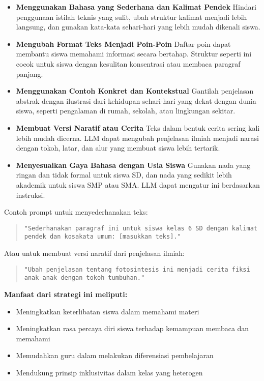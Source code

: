 \begin{itemize}
	\item \textbf{Menggunakan Bahasa yang Sederhana dan Kalimat Pendek}  
	Hindari penggunaan istilah teknis yang sulit, ubah struktur kalimat menjadi lebih langsung, dan gunakan kata-kata sehari-hari yang lebih mudah dikenali siswa.
	
	\item \textbf{Mengubah Format Teks Menjadi Poin-Poin}  
	Daftar poin dapat membantu siswa memahami informasi secara bertahap. Struktur seperti ini cocok untuk siswa dengan kesulitan konsentrasi atau membaca paragraf panjang.
	
	\item \textbf{Menggunakan Contoh Konkret dan Kontekstual}  
	Gantilah penjelasan abstrak dengan ilustrasi dari kehidupan sehari-hari yang dekat dengan dunia siswa, seperti pengalaman di rumah, sekolah, atau lingkungan sekitar.
	
	\item \textbf{Membuat Versi Naratif atau Cerita}  
	Teks dalam bentuk cerita sering kali lebih mudah dicerna. LLM dapat mengubah penjelasan ilmiah menjadi narasi dengan tokoh, latar, dan alur yang membuat siswa lebih tertarik.
	
	\item \textbf{Menyesuaikan Gaya Bahasa dengan Usia Siswa}  
	Gunakan nada yang ringan dan tidak formal untuk siswa SD, dan nada yang sedikit lebih akademik untuk siswa SMP atau SMA. LLM dapat mengatur ini berdasarkan instruksi.
	
\end{itemize}

Contoh prompt untuk menyederhanakan teks:

\begin{quote}
	\centering
	\texttt{"Sederhanakan paragraf ini untuk siswa kelas 6 SD dengan kalimat pendek dan kosakata umum: [masukkan teks]."}
\end{quote}

Atau untuk membuat versi naratif dari penjelasan ilmiah:

\begin{quote}
	\centering
	\texttt{"Ubah penjelasan tentang fotosintesis ini menjadi cerita fiksi anak-anak dengan tokoh tumbuhan."}
\end{quote}

\textbf{Manfaat dari strategi ini meliputi:}
\begin{itemize}
	\item Meningkatkan keterlibatan siswa dalam memahami materi
	\item Meningkatkan rasa percaya diri siswa terhadap kemampuan membaca dan memahami
	\item Memudahkan guru dalam melakukan diferensiasi pembelajaran
	\item Mendukung prinsip inklusivitas dalam kelas yang heterogen
\end{itemize}

